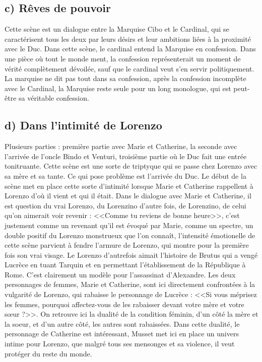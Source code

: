 \documentclass[12pt]{article}
\begin{document}
\subsection*{c) Rêves de pouvoir}
Cette scène est un dialogue entre la Marquise Cibo et le Cardinal, qui se caractérisent tous les deux par leurs désirs et leur ambitions liées à la proximité avec le Duc.
Dans cette scène, le cardinal entend la Marquise en confession. Dans une pièce où tout le monde ment, la confession représenterait un moment de vérité complètement dévoilée, sauf que le cardinal veut s'en servir politiquement.
La marquise ne dit pas tout dans sa confession, après la confession incomplète avec le Cardinal, la Marquise reste seule pour un long monologue, qui est peut-être sa véritable confession.
\subsection*{d) Dans l'intimité de Lorenzo}
Plusieurs parties : première partie avec Marie et Catherine, la seconde avec l'arrivée de l'oncle Bindo et Venturi, troisième partie où le Duc fait une entrée tonitruante.
Cette scène est une sorte de triptyque qui se passe chez Lorenzo avec sa mère et sa tante.
Ce qui pose problème est l'arrivée du Duc.
Le début de la scène met en place cette sorte d'intimité lorsque Marie et Catherine rappellent à Lorenzo d'où il vient et qui il était.
Dans le dialogue avec Marie et Catherine, il est question du vrai Lorenzo, du Lorenzino d'autre fois, de Lorenzino, de celui qu'on aimerait voir revenir : <<Comme tu reviens de bonne heure>>, c'est justement comme un revenant qu'il est évoqué par Marie, comme un spectre, un double positif du Lorenzo monstrueux que l'on connaît, l'intensité émotionelle de cette scène parvient à fendre l'armure de Lorenzo, qui montre pour la première fois son vrai visage.
Le Lorenzo d'autrefois aimait l'histoire de Brutus qui a vengé Lucrèce en tuant Tarquin et en permettant l'établissement de la République à Rome.
C'est clairement un modèle pour l'assassinat d'Alexandre.
Les deux personnages de femmes, Marie et Catherine, sont ici directement confrontées à la vulgarité de Lorenzo, qui rabaisse le personnage de Lucrèce : <<Si vous méprisez les femmes, pourquoi affectez-vous de les rabaisser devant votre mère et votre sœur ?>>.
On retrouve ici la dualité de la condition féminin, d'un côté la mère et la soeur, et d'un autre côté, les autres sont rabaissées.
Dans cette dualité, le personnage de Catherine est intéressant, Musset met ici en place un univers intime pour Lorenzo, que malgré tous ses mensonges et sa violence, il veut protéger du reste du monde.
\end{document}
